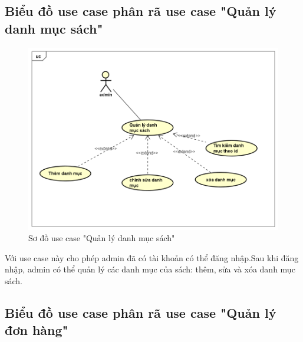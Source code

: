 \documentclass[../DoAn.tex]{subfiles}
\begin{document}
\subsection{Biểu đồ use case phân rã use case "Quản lý danh mục sách"}
\label{subsection:2.2.3}
\begin{figure}[H] %
\centering
\includegraphics[width=1\linewidth]{Hinhve/quản lý danh mục sách.png}
\caption{Sơ đồ use case "Quản lý danh mục sách"}
\label{fig:UsecaseControlCategory}
\end{figure}
Với use case này cho phép admin đã có tài khoản có thể đăng nhập.Sau khi đăng nhập, admin có thể quản lý các danh mục của sách: thêm, sửa và xóa danh mục sách.

\subsection{Biểu đồ use case phân rã use case "Quản lý đơn hàng"}
\label{subsection:2.2.4}
\end{document}
